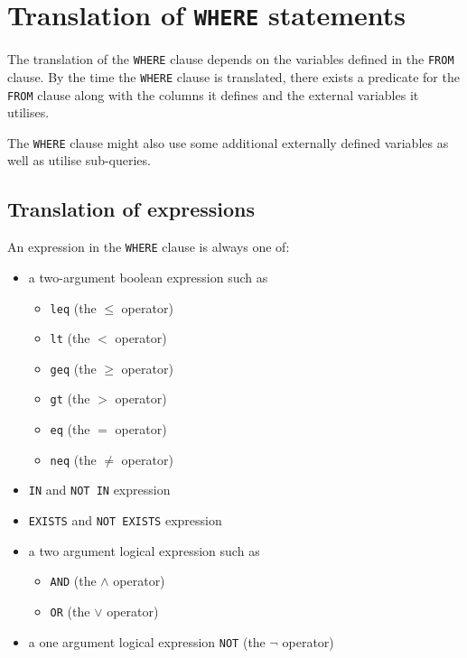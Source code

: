 \documentclass[magisterska,en]{pracamgr}
\newcommand{\code}[1]{\texttt{#1}}
\begin{document}
\section{Translation of \code{WHERE} statements}

The translation of the \code{WHERE} clause depends on the variables defined in the \code{FROM} clause. By the time the \code{WHERE} clause is translated, there exists a predicate for the \code{FROM} clause along with the columns it defines and the external variables it utilises.

The \code{WHERE} clause might also use some additional externally defined variables as well as utilise sub-queries.

\subsection{Translation of expressions}

An expression in the \code{WHERE} clause is always one of:
\begin{itemize}
    \item a two-argument boolean expression such as
        \begin{itemize}
            \item \code{leq} (the $\leq$ operator)
            \item \code{lt} (the $<$ operator)
            \item \code{geq} (the $\geq$ operator)
            \item \code{gt} (the $>$ operator)
            \item \code{eq} (the $=$ operator)
            \item \code{neq} (the $\neq$ operator)
        \end{itemize}
    \item \code{IN} and \code{NOT IN} expression
    \item \code{EXISTS} and \code{NOT EXISTS} expression
    \item a two argument logical expression such as
        \begin{itemize}
            \item \code{AND} (the $\land$ operator)
            \item \code{OR} (the $\lor$ operator)
        \end{itemize}
    \item a one argument logical expression \code{NOT} (the $\neg$ operator)
\end{itemize}
\end{document}
